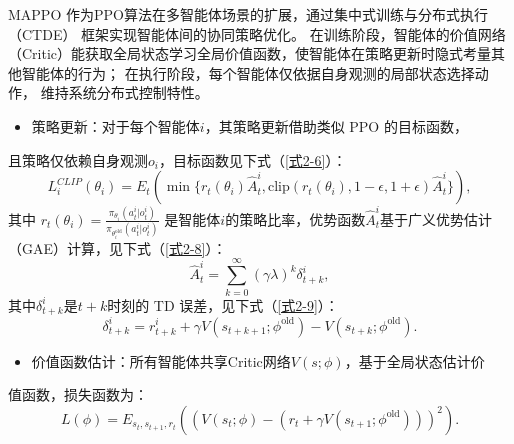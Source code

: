 MAPPO 作为PPO算法在多智能体场景的扩展，通过集中式训练与分布式执行（CTDE）
框架实现智能体间的协同策略优化。
在训练阶段，智能体的价值网络（Critic）能获取全局状态学习全局价值函数，使智能体在策略更新时隐式考量其他智能体的行为；
在执行阶段，每个智能体仅依据自身观测的局部状态选择动作，
维持系统分布式控制特性。

\begin{itemize}
    \item 策略更新：对于每个智能体\(i\)，其策略更新借助类似 PPO 的目标函数，
\end{itemize}
且策略仅依赖自身观测\(o_i\)，目标函数见下式（\ref{式2-6}）：
\begin{equation}\label{式2-6}
    L^{CLIP}_i(\theta_i) = E_t \left( \min \{  r_t(\theta_i) \hat{A}_t^i, \text{clip}(r_t(\theta_i), 1 - \epsilon, 1 + \epsilon) \hat{A}_t^i\}  \right),
\end{equation}
其中
$r_t(\theta_i) = \frac{\pi_{\theta_i}(a_t^i | o_t^i)}{\pi_{\theta_i^{\text{old}}}(a_t^i | o_t^i)} $
是智能体\(i\)的策略比率，优势函数\(\hat{A}_t^i\)基于广义优势估计
（GAE）计算，见下式（\ref{式2-8}）：
\begin{equation}\label{式2-8}
    \hat{A}_t^i = \sum_{k = 0}^{\infty}(\gamma\lambda)^k\delta_{t + k}^i,
\end{equation}
其中\(\delta_{t + k}^i\)是\(t + k\)时刻的 TD 误差，见下式（\ref{式2-9}）：
\begin{equation}\label{式2-9}
    \delta_{t+k}^i = r_{t+k}^i + \gamma V(s_{t+k+1}; \phi^{\text{old}}) - V(s_{t+k}; \phi^{\text{old}}).
\end{equation}

\begin{itemize}
    \item 价值函数估计：所有智能体共享Critic网络\(V(s; \phi)\)，基于全局状态估计价
\end{itemize}
值函数，损失函数为：
\begin{equation}\label{式2-7}
    L(\phi) = E_{s_t, s_{t+1}, r_t} \left( \left( V(s_t; \phi) - (r_t + \gamma V(s_{t+1}; \phi^{\text{old}})) \right)^2 \right).
\end{equation}


